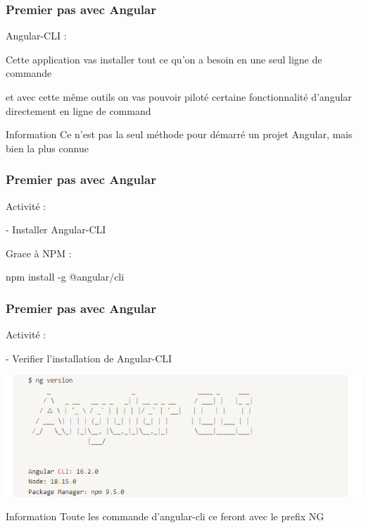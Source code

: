 \documentclass[10pt]{beamer}
\begin{document}
	\begin{frame}
		\frametitle{Premier pas avec Angular}

		Angular-CLI :  \newline \newline

		\centering
		Cette application vas installer tout ce qu’on a besoin \newline en une seul ligne de commande  \newline \newline

		et avec cette même outils on vas pouvoir piloté certaine fonctionnalité d’angular directement en ligne de command  \newline \newline

		\begin{block}{Information}
			Ce n'est pas la seul méthode pour démarré un projet Angular, mais bien la plus connue
		\end{block}

	\end{frame}


	\begin{frame}
		\frametitle{Premier pas avec Angular}

		Activité : \newline \newline

		- Installer Angular-CLI  \newline \newline

		Grace à NPM :  \newline \newline

		npm install -g @angular/cli


	\end{frame}

	\begin{frame}
		\frametitle{Premier pas avec Angular}

		Activité : \newline \newline

		- Verifier l'installation de Angular-CLI  \newline \newline

		\includegraphics[width=16cm]{assets/angularCLInstall} \newline

		\begin{block}{Information}
			Toute les commande d'angular-cli ce feront avec le prefix NG
		\end{block}

	\end{frame}
\end{document}
